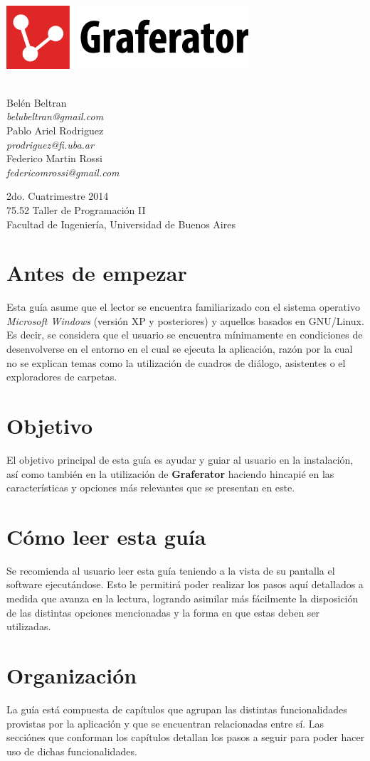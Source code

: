 \documentclass{book}
\makeatletter
\newcommand*{\titleGM}{\begingroup %
\newcommand*{\sepline}{\color{gray85}\rule[0.5ex]{30em}{0.55pt}}
	
	
\begin{center}

	\vspace*{1.5cm} 

	\includegraphics[width=9cm]{images/graferator-logo.png} \\[12\baselineskip]

	
	\colorbox{gray95}{
		\parbox[t]{1.0\linewidth}{
			\vspace*{0.7cm} %
			
			\centering {\Huge\bfseries\color{gray50}\fontfamily{fvs}\selectfont Carpeta de Desarrollo}\par %
			
			\vspace*{0.7cm} %
		}
	}\\[10\baselineskip]


		\Large Belén Beltran \\
		\large \textit{belubeltran@gmail.com} \\ \medskip
		\Large Pablo Ariel Rodriguez \\
		\large \textit{prodriguez@fi.uba.ar} \\ \medskip
		\Large Federico Martin Rossi \\ 
		\large \textit{federicomrossi@gmail.com} \\

		\bigskip\bigskip\bigskip\bigskip

		\large 2do. Cuatrimestre 2014 \\ \smallskip
		\large 75.52 Taller de Programación II \\ \smallskip
		\large Facultad de Ingeniería, Universidad de Buenos Aires \\ \smallskip

\end{center}

\endgroup}
\makeatother
\begin{document}

\thispagestyle{empty}


\titleGM



%
%
\section*{\bfseries\color{black}Antes de empezar}

Esta guía asume que el lector se encuentra familiarizado con el sistema operativo \textit{Microsoft Windows} (versión XP y posteriores) y aquellos basados en GNU/Linux. Es decir, se considera que el usuario se encuentra mínimamente en condiciones de desenvolverse en el entorno en el cual se ejecuta la aplicación, razón por la cual no se explican temas como la utilización de cuadros de diálogo, asistentes o el exploradores de carpetas.
\bigskip


\section*{Objetivo}

El objetivo principal de esta guía es ayudar y guiar al usuario en la instalación, así como también en la utilización de \textbf{Graferator} haciendo hincapié en las características y opciones más relevantes que se presentan en este. 
\bigskip


\section*{\bfseries\color{black}Cómo leer esta guía}

Se recomienda al usuario leer esta guía teniendo a la vista de su pantalla el software ejecutándose. Esto le permitirá poder realizar los pasos aquí detallados a medida que avanza en la lectura, logrando asimilar más fácilmente la disposición de las distintas opciones mencionadas y la forma en que estas deben ser utilizadas.
\bigskip


\section*{\bfseries\color{black}Organización}

La guía está compuesta de capítulos que agrupan las distintas funcionalidades provistas por la aplicación y que se encuentran relacionadas entre sí. Las secciónes que conforman los capítulos detallan los pasos a seguir para poder hacer uso de dichas funcionalidades.
\end{document}
